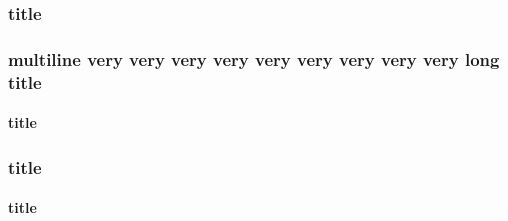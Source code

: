 \documentclass[xcolor={dvipsnames},aspectratio=1610]{beamer}
\begin{document}
\begin{frame}
    \frametitle{title}
\end{frame}

\begin{frame}
    \frametitle{multiline very very very very very very very very very long title}
    \framesubtitle{title}
\end{frame}

\begin{frame}
    \frametitle{title}
    \framesubtitle{title}
\end{frame}
\end{document}
